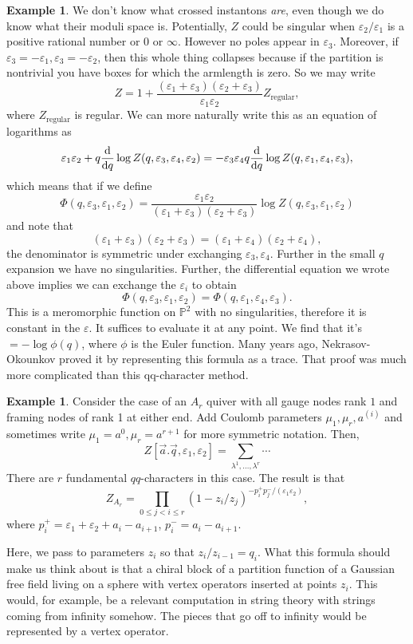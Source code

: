 \documentclass[leqno, openany]{memoir}
\theoremstyle{definition}
\newtheorem{exm}[thm]{Example}
\theoremstyle{remark}
\theoremstyle{plain}
\theoremstyle{definition}
\theoremstyle{remark}
\newcommand{\ep}{\varepsilon}
\newcommand{\mr}[1]{\mathrm{#1}}
\begin{document}
\begin{exm}
We don't know what crossed instantons \emph{are}, even though we do know what their moduli space is. 
Potentially, $Z$ could be singular when $\ep_2/\ep_1$ is a positive rational number or 0 or $\infty$. 
However no poles appear in $\ep_3$. Moreover, if $\ep_3 = -\ep_1,\ep_3 = - \ep_2$, then this whole 
thing collapses because if the partition is nontrivial you have boxes for which the armlength is zero. 
So we may write 
\[
Z = 1 + \frac{(\ep_1 + \ep_3)(\ep_2 + \ep_3)}{\ep_1 \ep_2} Z_{\mr{regular}},
\]
where $Z_{\mr{regular}}$ is regular.  
We can more naturally write this as an equation of logarithms as
\[
\ep_1 \ep_2 + q \dv{q} \log Z (q,\ep_3, \ep_4, \ep_2) = - \ep_3 \ep_4 q \dv{q} \log Z(q, \ep_1,\ep_4,\ep_3),
\]
which means that if we define 
\[
\Phi(q,\ep_3,\ep_1,\ep_2) = \frac{\ep_1 \ep_2}{(\ep_1 + \ep_3)(\ep_2 + \ep_3)} \log Z(q, \ep_3, \ep_1,\ep_2)
\]
and note that 
\[
(\ep_1 + \ep_3)(\ep_2 + \ep_3) = (\ep_1 + \ep_4)(\ep_2 + \ep_4),
\]
the denominator is symmetric under exchanging $\ep_3,\ep_4$. Further in the small $q$ expansion we have no singularities. 
Further, the differential equation we wrote above implies we can exchange the $\ep_i$ to obtain
\[
\Phi(q,\ep_3,\ep_1,\ep_2) = \Phi(q, \ep_1, \ep_4, \ep_3).
\]
This is a meromorphic function on $\mathbb{P}^2$ with no singularities, therefore it is constant in the $\ep$. It suffices to evaluate it at any point. 
We find that it's $= - \log \phi(q)$, where $\phi$ is the Euler function. 
Many years ago, Nekrasov-Okounkov proved it by representing this formula as a trace. That proof was much more complicated 
than this qq-character method. 
\end{exm}

\begin{exm}
Consider the case of an $A_r$ quiver with all gauge nodes rank $1$ and framing nodes of rank 1 at either end. 
Add Coulomb parameters $\mu_1,\mu_r, a^{(i)}$ and sometimes write $\mu_1 = a^0, \mu_{r} = a^{r + 1}$ for more symmetric notation. 
Then, 
\[
Z[\vec{a}.\vec{q},\ep_1,\ep_2] = \sum_{\lambda^1,\dots,\lambda^r} \cdots 
\]
There are $r$ fundamental $qq$-characters in this case. The result is that 
\[
Z_{A_r} = \prod_{0 \leq j < i \leq r} (1 - z_i/z_j)^{-p_i^+ p_j^-/(\ep_1\ep_2)},
\]
where $p_i^+ = \ep_1 + \ep_2 + a_i - a_{i+1}$, $p_i^- = a_i - a_{i+1}$. 

Here, we pass to parameters $z_i$ so that $z_i/z_{i - 1} = q_i$. 
What this formula should make us think about is that a chiral block of a partition function of a Gaussian free field living on a sphere 
with vertex operators inserted at points $z_i$. 
This would, for example, be a relevant computation in string theory with strings coming from infinity somehow. 
The pieces that go off to infinity would be represented by a vertex operator.
\end{exm}
\end{document}
